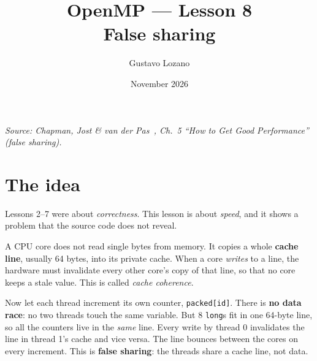 \documentclass[11pt,a4paper]{article}
\title{\textbf{OpenMP --- Lesson 8}\\[4pt]\large False sharing}
\author{Gustavo Lozano}
\date{November 2026}
\begin{document}
\maketitle

\noindent\textit{\small Source: Chapman, Jost \& van der Pas~\cite{chapman}, Ch.~5
``How to Get Good Performance'' (false sharing).}

\section{The idea}
Lessons 2--7 were about \emph{correctness}. This lesson is about \emph{speed}, and it
shows a problem that the source code does not reveal.

A CPU core does not read single bytes from memory. It copies a whole \textbf{cache line},
usually 64 bytes, into its private cache. When a core \emph{writes} to a line, the
hardware must invalidate every other core's copy of that line, so that no core keeps a
stale value. This is called \emph{cache coherence}.

Now let each thread increment its own counter, \texttt{packed[id]}. There is \textbf{no
data race}: no two threads touch the same variable. But 8 \texttt{long}s fit in one 64-byte
line, so all the counters live in the \emph{same} line. Every write by thread 0 invalidates
the line in thread 1's cache and vice versa. The line bounces between the cores on every
increment. This is \textbf{false sharing}: the threads share a cache line, not data.

\begin{center}
\end{center}
\end{document}
